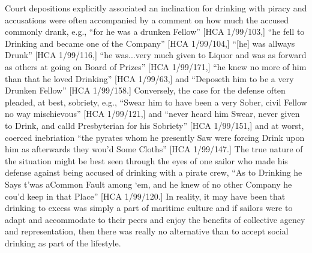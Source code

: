 \begin{styleStandard}
Court depositions explicitly associated an inclination for drinking with piracy and accusations were often accompanied by a comment on how much the accused commonly drank, e.g., “for he was a drunken Fellow” [HCA 1/99/103,] “he fell to Drinking and became one of the Company” [HCA 1/99/104,] “[he] was allways Drunk” [HCA 1/99/116,] “he was...very much given to Liquor and was as forward as others at going on Board of Prizes” [HCA 1/99/171,] “he knew no more of him than that he loved Drinking” [HCA 1/99/63,] and “Deposeth him to be a very Drunken Fellow” [HCA 1/99/158.] Conversely, the case for the defense often pleaded, at best, sobriety, e.g., “Swear him to have been a very Sober, civil Fellow no way mischievous” [HCA 1/99/121,] and “never heard him Swear, never given to Drink, and calld Presbyterian for his Sobriety” [HCA 1/99/151,] and at worst, coerced inebriation “the pyrates whom he presently Saw were forcing Drink upon him as afterwards they wou’d Some Cloths” [HCA 1/99/147.] The true nature of the situation might be best seen through the eyes of one sailor who made his defense against being accused of drinking with a pirate crew, “As to Drinking he Says t’was aCommon Fault among ‘em, and he knew of no other Company he cou’d keep in that Place” [HCA 1/99/120.] In reality, it may have been that drinking to excess was simply a part of maritime culture and if sailors were to adapt and accommodate to their peers and enjoy the benefits of collective agency and representation, then there was really no alternative than to accept social drinking as part of the lifestyle. \ 
\end{styleStandard}

